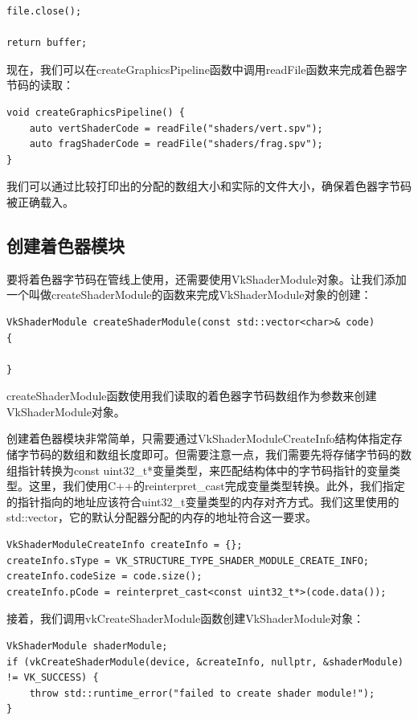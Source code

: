 \documentclass{ctexart}
\begin{document}
\begin{lstlisting}[language={[ANSI]C}]
file.close();

return buffer;
\end{lstlisting}

现在，我们可以在createGraphicsPipeline函数中调用readFile函数来完成着色器字节码的读取：

\begin{lstlisting}[language={[ANSI]C}]
void createGraphicsPipeline() {
	auto vertShaderCode = readFile("shaders/vert.spv");
	auto fragShaderCode = readFile("shaders/frag.spv");
}
\end{lstlisting}

我们可以通过比较打印出的分配的数组大小和实际的文件大小，确保着色器字节码被正确载入。

\subsection{创建着色器模块}

要将着色器字节码在管线上使用，还需要使用VkShaderModule对象。让我们添加一个叫做createShaderModule的函数来完成VkShaderModule对象的创建：

\begin{lstlisting}[language={[ANSI]C}]
VkShaderModule createShaderModule(const std::vector<char>& code)
{

}
\end{lstlisting}

createShaderModule函数使用我们读取的着色器字节码数组作为参数来创建VkShaderModule对象。

创建着色器模块非常简单，只需要通过VkShaderModuleCreateInfo结构体指定存储字节码的数组和数组长度即可。但需要注意一点，我们需要先将存储字节码的数组指针转换为const uint32\_t*变量类型，来匹配结构体中的字节码指针的变量类型。这里，我们使用C++的reinterpret\_cast完成变量类型转换。此外，我们指定的指针指向的地址应该符合uint32\_t变量类型的内存对齐方式。我们这里使用的std::vector，它的默认分配器分配的内存的地址符合这一要求。

\begin{lstlisting}[language={[ANSI]C}]
VkShaderModuleCreateInfo createInfo = {};
createInfo.sType = VK_STRUCTURE_TYPE_SHADER_MODULE_CREATE_INFO;
createInfo.codeSize = code.size();
createInfo.pCode = reinterpret_cast<const uint32_t*>(code.data());
\end{lstlisting}

接着，我们调用vkCreateShaderModule函数创建VkShaderModule对象：

\begin{lstlisting}[language={[ANSI]C}]
VkShaderModule shaderModule;
if (vkCreateShaderModule(device, &createInfo, nullptr, &shaderModule) != VK_SUCCESS) {
	throw std::runtime_error("failed to create shader module!");
}
\end{lstlisting}
\end{document}
